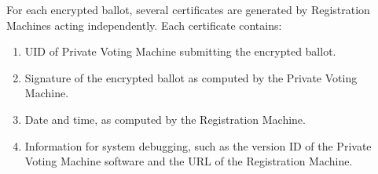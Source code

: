 \documentclass[12pt]{article}
\begin{document}
For each encrypted ballot, several certificates are generated
by Registration Machines acting independently.  Each certificate
contains:
\begin{enumerate}
\item UID of Private Voting Machine submitting the encrypted ballot.
\item Signature of the encrypted ballot as computed by the
      Private Voting Machine.
\item Date and time, as computed by the Registration Machine.
\item Information for system debugging, such as the version ID of the
      Private Voting Machine software and the URL of the Registration
      Machine.
\end{enumerate}
\end{document}
